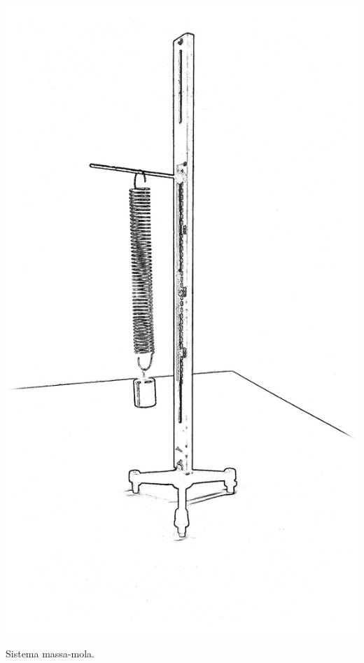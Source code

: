 \begin{marginfigure}[-2cm]
	\includegraphics[width=\textwidth]{Ilustrations/Massa-Mola.png}
	\caption{Sistema massa-mola.}
\end{marginfigure}

